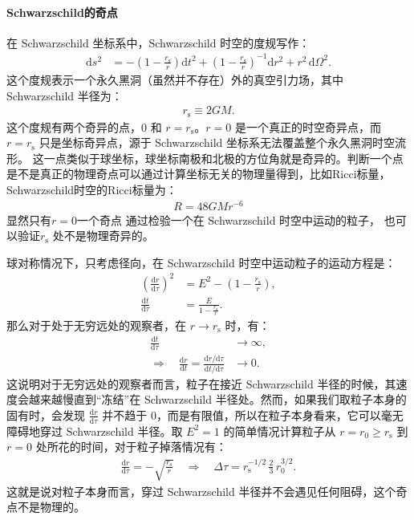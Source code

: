 \paragraph{Schwarzschild的奇点}
在 Schwarzschild 坐标系中，Schwarzschild 时空的度规写作：
\begin{align}
\mathrm{d}s^{2}
&=
- \left(1 - \frac{r_{\mathrm{s}}}{r}\right)\mathrm{d}t^{2}
+ \left(1 - \frac{r_{\mathrm{s}}}{r}\right)^{-1}\mathrm{d}r^{2}
+ r^{2}\,\mathrm{d}\Omega^{2}.
\label{eq:schwarzschild-metric-rs}
\end{align}
这个度规表示一个永久黑洞（虽然并不存在）外的真空引力场，其中 Schwarzschild 半径为：
\begin{align}
r_{\mathrm{s}} \equiv 2GM.
\label{eq:rs-def}
\end{align}
这个度规有两个奇异的点，$0$ 和 $r=r_{\mathrm{s}}$。$r=0$ 是一个真正的时空奇异点，而 $r=r_{\mathrm{s}}$ 只是坐标奇异点，源于 Schwarzschild 坐标系无法覆盖整个永久黑洞时空流形。
这一点类似于球坐标，球坐标南极和北极的方位角就是奇异的。判断一个点是不是真正的物理奇点可以通过计算坐标无关的物理量得到，比如Ricci标量，Schwarzschild时空的Ricci标量为：
\begin{align}
    R = 48GMr^{-6}
\end{align}
显然只有$r=0$一个奇点
通过检验一个在 Schwarzschild 时空中运动的粒子， 也可以验证$r_{\mathrm{s}}$ 处不是物理奇异的。
\begin{derivationnote}
    球对称情况下，只考虑径向，在 Schwarzschild 时空中运动粒子的运动方程是：
    \begin{align}
        \left(\frac{\mathrm{d}r}{\mathrm{d}\tau}\right)^{2}
        &= E^{2} - \left(1 - \frac{r_{\mathrm{s}}}{r}\right), \\
        \frac{\mathrm{d}t}{\mathrm{d}\tau}
        &= \frac{E}{1 - \frac{r_{\mathrm{s}}}{r}} .
    \end{align}
    那么对于处于无穷远处的观察者，在 $r\rightarrow r_{\mathrm{s}}$ 时，有：
    \begin{align}
        \frac{\mathrm{d}t}{\mathrm{d}\tau} &\rightarrow \infty, \\[4pt]
        \Rightarrow\quad
        \frac{\mathrm{d}r}{\mathrm{d}t}
        = \frac{\mathrm{d}r/\mathrm{d}\tau}{\mathrm{d}t/\mathrm{d}\tau}
        &\rightarrow 0 .
    \end{align}
    这说明对于无穷远处的观察者而言，粒子在接近 Schwarzschild 半径的时候，其速度会越来越慢直到“冻结”在 Schwarzschild 半径处。然而，如果我们取粒子本身的固有时，会发现 $\frac{\mathrm{d}r}{\mathrm{d}\tau}$ 并不趋于 $0$，而是有限值，所以在粒子本身看来，它可以毫无障碍地穿过 Schwarzschild 半径。取 $E^{2} = 1$ 的简单情况计算粒子从 $r = r_{0} \geq r_{\mathrm{s}}$ 到 $r = 0$ 处所花的时间，对于粒子掉落情况有：
    \begin{align}
        \frac{\mathrm{d}r}{\mathrm{d}\tau}
        = -\sqrt{\frac{r_{\mathrm{s}}}{r}}
        \quad\Rightarrow\quad
        \Delta \tau
        = r_{\mathrm{s}}^{-1/2}\,\frac{2}{3}\,r_{0}^{3/2} .
    \end{align}
    这就是说对粒子本身而言，穿过 Schwarzschild 半径并不会遇见任何阻碍，这个奇点不是物理的。
\end{derivationnote}

